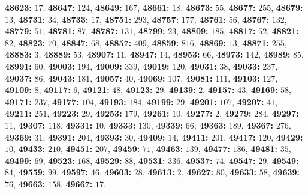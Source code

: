 \textsf{\bfseries 48623:} $17$, \textsf{\bfseries 48647:} $124$, \textsf{\bfseries 48649:} $167$, \textsf{\bfseries 48661:} $18$, \textsf{\bfseries 48673:} $55$, \textsf{\bfseries 48677:} $255$, \textsf{\bfseries 48679:} $13$, \textsf{\bfseries 48731:} $34$, \textsf{\bfseries 48733:} $17$, \textsf{\bfseries 48751:} $293$, \textsf{\bfseries 48757:} $177$, \textsf{\bfseries 48761:} $56$, \textsf{\bfseries 48767:} $132$, \textsf{\bfseries 48779:} $51$, \textsf{\bfseries 48781:} $87$, \textsf{\bfseries 48787:} $131$, \textsf{\bfseries 48799:} $23$, \textsf{\bfseries 48809:} $185$, \textsf{\bfseries 48817:} $52$, \textsf{\bfseries 48821:} $82$, \textsf{\bfseries 48823:} $70$, \textsf{\bfseries 48847:} $68$, \textsf{\bfseries 48857:} $409$, \textsf{\bfseries 48859:} $816$, \textsf{\bfseries 48869:} $13$, \textsf{\bfseries 48871:} $255$, \textsf{\bfseries 48883:} $3$, \textsf{\bfseries 48889:} $53$, \textsf{\bfseries 48907:} $11$, \textsf{\bfseries 48947:} $14$, \textsf{\bfseries 48953:} $66$, \textsf{\bfseries 48973:} $142$, \textsf{\bfseries 48989:} $85$, \textsf{\bfseries 48991:} $60$, \textsf{\bfseries 49003:} $194$, \textsf{\bfseries 49009:} $339$, \textsf{\bfseries 49019:} $120$, \textsf{\bfseries 49031:} $38$, \textsf{\bfseries 49033:} $237$, \textsf{\bfseries 49037:} $86$, \textsf{\bfseries 49043:} $181$, \textsf{\bfseries 49057:} $40$, \textsf{\bfseries 49069:} $107$, \textsf{\bfseries 49081:} $111$, \textsf{\bfseries 49103:} $127$, \textsf{\bfseries 49109:} $8$, \textsf{\bfseries 49117:} $6$, \textsf{\bfseries 49121:} $48$, \textsf{\bfseries 49123:} $29$, \textsf{\bfseries 49139:} $2$, \textsf{\bfseries 49157:} $43$, \textsf{\bfseries 49169:} $58$, \textsf{\bfseries 49171:} $237$, \textsf{\bfseries 49177:} $104$, \textsf{\bfseries 49193:} $184$, \textsf{\bfseries 49199:} $29$, \textsf{\bfseries 49201:} $107$, \textsf{\bfseries 49207:} $41$, \textsf{\bfseries 49211:} $251$, \textsf{\bfseries 49223:} $29$, \textsf{\bfseries 49253:} $179$, \textsf{\bfseries 49261:} $10$, \textsf{\bfseries 49277:} $2$, \textsf{\bfseries 49279:} $284$, \textsf{\bfseries 49297:} $11$, \textsf{\bfseries 49307:} $118$, \textsf{\bfseries 49331:} $10$, \textsf{\bfseries 49333:} $130$, \textsf{\bfseries 49339:} $66$, \textsf{\bfseries 49363:} $189$, \textsf{\bfseries 49367:} $276$, \textsf{\bfseries 49369:} $31$, \textsf{\bfseries 49391:} $204$, \textsf{\bfseries 49393:} $30$, \textsf{\bfseries 49409:} $14$, \textsf{\bfseries 49411:} $201$, \textsf{\bfseries 49417:} $120$, \textsf{\bfseries 49429:} $10$, \textsf{\bfseries 49433:} $210$, \textsf{\bfseries 49451:} $207$, \textsf{\bfseries 49459:} $71$, \textsf{\bfseries 49463:} $139$, \textsf{\bfseries 49477:} $186$, \textsf{\bfseries 49481:} $35$, \textsf{\bfseries 49499:} $69$, \textsf{\bfseries 49523:} $168$, \textsf{\bfseries 49529:} $88$, \textsf{\bfseries 49531:} $336$, \textsf{\bfseries 49537:} $74$, \textsf{\bfseries 49547:} $29$, \textsf{\bfseries 49549:} $84$, \textsf{\bfseries 49559:} $99$, \textsf{\bfseries 49597:} $46$, \textsf{\bfseries 49603:} $28$, \textsf{\bfseries 49613:} $2$, \textsf{\bfseries 49627:} $80$, \textsf{\bfseries 49633:} $58$, \textsf{\bfseries 49639:} $76$, \textsf{\bfseries 49663:} $158$, \textsf{\bfseries 49667:} $17$, 
